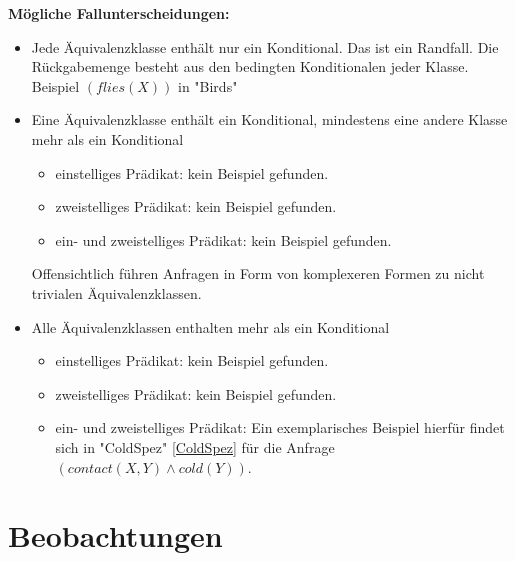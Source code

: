\documentclass[draft]{scrreprt}
\begin{document}
\textbf{Mögliche Fallunterscheidungen:}\label{Fallunterscheidung Formel MehrAequi}
	\begin{itemize}
		\item Jede Äquivalenzklasse enthält nur ein Konditional. Das ist ein Randfall. Die Rückgabemenge besteht aus den bedingten Konditionalen jeder Klasse. Beispiel $ (flies(X)) $ in "{}Birds"{}  
		\item Eine Äquivalenzklasse enthält ein Konditional, mindestens eine andere Klasse mehr als ein Konditional
		\begin{itemize}
			\item einstelliges Prädikat: kein Beispiel gefunden.
			\item zweistelliges Prädikat: kein Beispiel gefunden.
			\item ein- und zweistelliges Prädikat: kein Beispiel gefunden.
		\end{itemize}
		Offensichtlich führen Anfragen in Form von komplexeren Formen zu nicht trivialen Äquivalenzklassen. 
		\item Alle Äquivalenzklassen enthalten mehr als ein Konditional
			\begin{itemize}
			\item einstelliges Prädikat: kein Beispiel gefunden.
				\item zweistelliges Prädikat: kein Beispiel gefunden.
			\item ein- und zweistelliges Prädikat: Ein exemplarisches Beispiel hierfür findet sich in "{}ColdSpez"{} \ref{ColdSpez} für die Anfrage  $ (contact(X,Y) \land cold(Y)) $.
		\end{itemize}
	\end{itemize}

\section{Beobachtungen}
\end{document}

